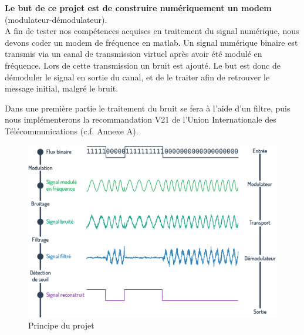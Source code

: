 
\textbf{Le but de ce projet est de construire numériquement un modem} (modulateur-démodulateur). \\
A fin de tester nos compétences acquises en traitement du signal numérique, nous devons coder un modem 
de fréquence en matlab.
Un signal numérique binaire est transmis via un canal de transmission virtuel après avoir été modulé en 
fréquence. Lors de cette transmission un bruit est ajouté. Le but est donc de démoduler le signal en
sortie du canal, et de le traiter afin de retrouver le message initial, malgré le bruit.

Dans une première partie le traitement du bruit se fera à l'aide d'un filtre, puis nous implémenterons 
la recommandation V21 de l’Union Internationale des Télécommunications (c.f. Annexe A).

\begin{figure}[ht!]
   \centering
   \includegraphics[scale=0.4]{partie-1/sous-partie-1/but}
   \caption{Principe du projet \label{fig : principe_projet}}
\end{figure}